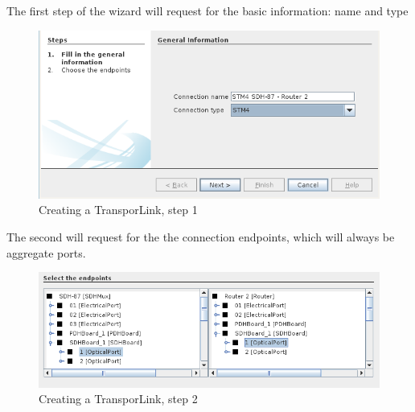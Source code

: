 \documentclass[a4paper]{article}
\begin{document}
		The first step of the wizard will request for the basic information: name and type
		\begin{figure}[h!]
			\centering
			\includegraphics[width=\linewidth]{img/sdh_module_transport_link_step_1.png}
			\caption{Creating a TransporLink, step 1}
			\label{fig:sdh_module_transport_link_step_1}
		\end{figure}
		\newpage
		The second will request for the the connection endpoints, which will always be aggregate ports.
		\begin{figure}[h!]
			\centering
			\includegraphics[width=\linewidth]{img/sdh_module_transport_link_step_2.png}
			\caption{Creating a TransporLink, step 2}
			\label{fig:sdh_module_transport_link_step_2}
		\end{figure}
		
\end{document}
